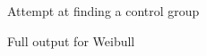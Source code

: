 \documentclass{beamer}
\begin{document}

\begin{frame}{Attempt at finding a control group}
\centering
\resizebox{0.9\linewidth}{!}{

}

\end{frame}


\begin{frame}{Full output for Weibull}

\centering


\end{frame}


\end{document}
